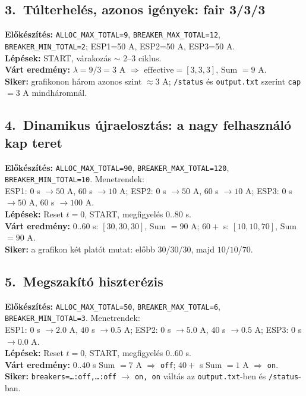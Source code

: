 \subsection{3.\ Túlterhelés, azonos igények: fair 3/3/3}
\textbf{Előkészítés:} \texttt{ALLOC\_MAX\_TOTAL=9}, \texttt{BREAKER\_MAX\_TOTAL=12}, \texttt{BREAKER\_MIN\_TOTAL=2}; ESP1=50 A, ESP2=50 A, ESP3=50 A.\\
\textbf{Lépések:} START, várakozás \(\sim\) 2--3 ciklus.\\
\textbf{Várt eredmény:} \(\lambda=9/3=3\) A \(\Rightarrow\) \(\mathrm{effective}=[3,3,3]\), Sum \(=9\) A.\\
\textbf{Siker:} grafikonon három azonos szint \(\approx 3\) A; \texttt{/status} és \texttt{output.txt} szerint \texttt{cap}\(=3\) A mindháromnál.

\subsection{4.\ Dinamikus újraelosztás: a nagy felhasználó kap teret}
\textbf{Előkészítés:} \texttt{ALLOC\_MAX\_TOTAL=90}, \texttt{BREAKER\_MAX\_TOTAL=120}, \texttt{BREAKER\_MIN\_TOTAL=10}. Menetrendek: \\
ESP1: \(0\) s \(\to 50\) A, \(60\) s \(\to 10\) A; \;
ESP2: \(0\) s \(\to 50\) A, \(60\) s \(\to 10\) A; \;
ESP3: \(0\) s \(\to 50\) A, \(60\) s \(\to 100\) A.\\
\textbf{Lépések:} Reset \(t{=}0\), START, megfigyelés \(0..80\) s.\\
\textbf{Várt eredmény:} \(0..60\) s: \([30,30,30]\), Sum \(=90\) A; \(60+\) s: \([10,10,70]\), Sum \(=90\) A.\\
\textbf{Siker:} a grafikon két platót mutat: előbb \(30\)/\(30\)/\(30\), majd \(10\)/\(10\)/\(70\).

\subsection{5.\ Megszakító hiszterézis}
\textbf{Előkészítés:} \texttt{ALLOC\_MAX\_TOTAL=50}, \texttt{BREAKER\_MAX\_TOTAL=6}, \texttt{BREAKER\_MIN\_TOTAL=3}. Menetrendek: \\
ESP1: \(0\) s \(\to 2.0\) A, \(40\) s \(\to 0.5\) A; \;
ESP2: \(0\) s \(\to 5.0\) A, \(40\) s \(\to 0.5\) A; \;
ESP3: \(0\) s \(\to 0.0\) A.\\
\textbf{Lépések:} Reset \(t{=}0\), START, megfigyelés \(0..60\) s.\\
\textbf{Várt eredmény:} \(0..40\) s Sum \(=7\) A \(\Rightarrow\) \texttt{off}; \(40+\) s Sum \(=1\) A \(\Rightarrow\) \texttt{on}.\\
\textbf{Siker:} \texttt{breakers=\dots:off,\dots:off} \(\to\) \texttt{on,\ on} váltás az \texttt{output.txt}-ben és \texttt{/status}-ban.

